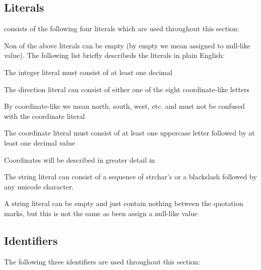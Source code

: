 \subsection{Literals}
\productname{} consists of the following four literals which are used throughout this section:

\begin{ebnf}
\end{ebnf}

Non of the above literals can be empty (by empty we mean assigned to null-like value). The following list briefly describeds the literals in plain English:

\begin{dlist}
\item The integer literal must consist of at least one decimal
\item The direction literal can consist of either one of the eight coordinate-like letters 
\begin{dlist}
\item By coordinate-like we mean north, south, west, etc. and must not be confused with the coordinate literal
\end{dlist}
\item The coordinate literal must consist of at least one uppercase letter followed by at least one decimal value
\begin{dlist}
\item Coordinates will be described in greater detail in 
\end{dlist}
\item The string literal can consist of a sequence of strchar's or a blackslash followed by any unicode character.
\begin{dlist}
\item A string literal can be empty and just contain nothing between the quotation marks, but this is not the same as been assign a null-like value
\end{dlist}
\end{dlist}

\subsection{Identifiers}
The following three identifiers are used throughout this section:

